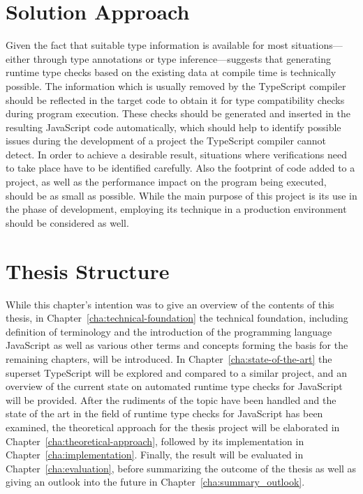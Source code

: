 \section{Solution Approach}
\label{sec:solution-approach}

Given the fact that suitable type information is available for most situations---either through type annotations or type inference---suggests that generating runtime type checks based on the existing data at compile time is technically possible. The information which is usually removed by the TypeScript compiler should be reflected in the target code to obtain it for type compatibility checks during program execution. These checks should be generated and inserted in the resulting JavaScript code automatically, which should help to identify possible issues during the development of a project the TypeScript compiler cannot detect. In order to achieve a desirable result, situations where verifications need to take place have to be identified carefully. Also the footprint of code added to a project, as well as the performance impact on the program being executed, should be as small as possible. While the main purpose of this project is its use in the phase of development, employing its technique in a production environment should be considered as well.

\section{Thesis Structure}
\label{sec:thesis-structure}

While this chapter's intention was to give an overview of the contents of this thesis, in Chapter~\ref{cha:technical-foundation} the technical foundation, including definition of terminology and the introduction of the programming language JavaScript as well as various other terms and concepts forming the basis for the remaining chapters, will be introduced. In Chapter~\ref{cha:state-of-the-art} the superset TypeScript will be explored and compared to a similar project, and an overview of the current state on automated runtime type checks for JavaScript will be provided. After the rudiments of the topic have been handled and the state of the art in the field of runtime type checks for JavaScript has been examined, the theoretical approach for the thesis project will be elaborated in Chapter~\ref{cha:theoretical-approach}, followed by its implementation in Chapter~\ref{cha:implementation}. Finally, the result will be evaluated in Chapter~\ref{cha:evaluation}, before summarizing the outcome of the thesis as well as giving an outlook into the future in Chapter~\ref{cha:summary_outlook}.
